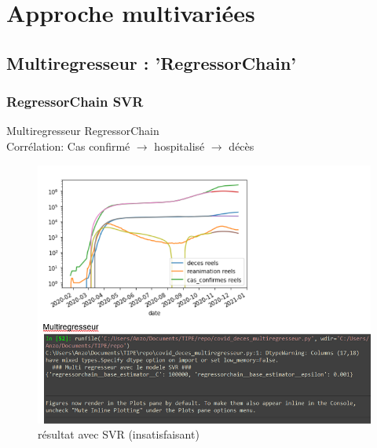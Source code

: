 \documentclass{beamer}
\begin{document}
\section{Approche multivariées}
\subsection{Multiregresseur : 'RegressorChain'}
\begin{frame}
	\frametitle{RegressorChain SVR}
	Multiregresseur RegressorChain\\ Corrélation: Cas confirmé $\rightarrow$ hospitalisé $\rightarrow$ décès 
	
	\begin{figure}[h]
		\includegraphics[scale=0.45]{mulitregr_epic_fail}%
		\caption{résultat avec SVR (insatisfaisant)}
	\end{figure}
\end{frame}
\end{document}
